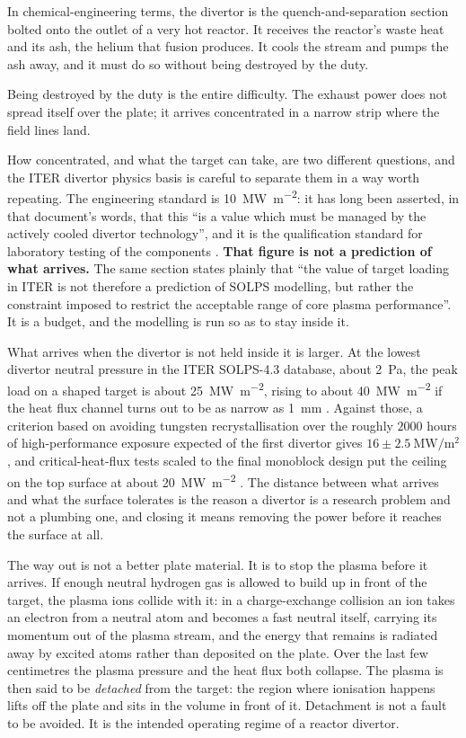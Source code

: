 In chemical-engineering terms, the divertor is the
quench-and-separation section bolted onto the outlet of a very hot reactor. It
receives the reactor's waste heat and its ash, the helium that fusion produces.
It cools the stream and pumps the ash away, and it must do so without being
destroyed by the duty.

Being destroyed by the duty is the entire difficulty. The exhaust power does not
spread itself over the plate; it arrives concentrated in a narrow strip where the
field lines land.

How concentrated, and what the target can take, are two different questions, and
the ITER divertor physics basis is careful to separate them in a way worth
repeating. The engineering standard is
\SI{10}{\mega\watt\per\square\metre}: it has long been asserted, in that
document's words, that this ``is a value which must be managed by the actively
cooled divertor technology'', and it is the qualification standard for
laboratory testing of the components \cite[Sec.~1]{Pitts2019}. \textbf{That
figure is not a prediction of what arrives.} The same section states plainly
that ``the value of target loading in ITER is not therefore a prediction of
SOLPS modelling, but rather the constraint imposed to restrict the acceptable
range of core plasma performance''. It is a budget, and the modelling is run so
as to stay inside it.

What arrives when the divertor is not held inside it is larger. At the lowest
divertor neutral pressure in the ITER SOLPS-4.3 database, about \SI{2}{\pascal},
the peak load on a shaped target is about
\SI{25}{\mega\watt\per\square\metre}, rising to about
\SI{40}{\mega\watt\per\square\metre} if the heat flux channel turns out to be as
narrow as \SI{1}{\milli\metre} \cite[Sec.~4]{Pitts2019}. Against those, a
criterion based on avoiding tungsten recrystallisation over the roughly $2000$
hours of high-performance exposure expected of the first divertor gives
$16\pm\SI{2.5}{\mega\watt\per\square\metre}$, and
critical-heat-flux tests scaled to the final monoblock design put the ceiling on
the top surface at about \SI{20}{\mega\watt\per\square\metre}
\cite[Sec.~4]{Pitts2019}. The distance between what arrives and what the surface
tolerates is the reason a divertor is a research problem and not a plumbing
one, and closing it means removing the power before it reaches the surface at
all.

The way out is not a better plate material. It is to stop the plasma before it
arrives. If enough neutral hydrogen gas is allowed to build up in front of the
target, the plasma ions collide with it: in a charge-exchange collision an ion
takes an electron from a neutral atom and becomes a fast neutral itself, carrying
its momentum out of the plasma stream, and the energy that remains is radiated
away by excited atoms rather than deposited on the plate. Over the last few
centimetres the plasma pressure and the heat flux both collapse. The plasma is
then said to be \emph{detached} from the target: the region where ionisation
happens lifts off the plate and sits in the volume in front of it. Detachment is
not a fault to be avoided. It is the intended operating regime of a reactor
divertor.

